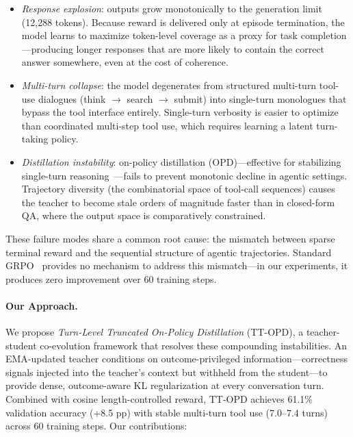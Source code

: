 \documentclass{article}
\begin{document}
\begin{itemize}[leftmargin=*,itemsep=2pt,topsep=2pt]
    \item \emph{Response explosion}: outputs grow monotonically to the generation limit (12,288 tokens). Because reward is delivered only at episode termination, the model learns to maximize token-level coverage as a proxy for task completion---producing longer responses that are more likely to contain the correct answer somewhere, even at the cost of coherence.

    \item \emph{Multi-turn collapse}: the model degenerates from structured multi-turn tool-use dialogues (think $\to$ search $\to$ submit) into single-turn monologues that bypass the tool interface entirely. Single-turn verbosity is easier to optimize than coordinated multi-step tool use, which requires learning a latent turn-taking policy.

    \item \emph{Distillation instability}: on-policy distillation (OPD)---effective for stabilizing single-turn reasoning~\citep{zhao26opsd, yang26rlsd}---fails to prevent monotonic decline in agentic settings. Trajectory diversity (the combinatorial space of tool-call sequences) causes the teacher to become stale orders of magnitude faster than in closed-form QA, where the output space is comparatively constrained.
\end{itemize}

These failure modes share a common root cause: the mismatch between sparse terminal reward and the sequential structure of agentic trajectories. Standard GRPO~\citep{shao2024deepseekmath} provides no mechanism to address this mismatch---in our experiments, it produces zero improvement over 60 training steps.

\paragraph{Our Approach.}
We propose \emph{Turn-Level Truncated On-Policy Distillation} (TT-OPD), a teacher-student co-evolution framework that resolves these compounding instabilities. An EMA-updated teacher conditions on outcome-privileged information---correctness signals injected into the teacher's context but withheld from the student---to provide dense, outcome-aware KL regularization at every conversation turn. Combined with cosine length-controlled reward, TT-OPD achieves 61.1\% validation accuracy (+8.5 pp) with stable multi-turn tool use (7.0--7.4 turns) across 60 training steps. Our contributions:
\end{document}
